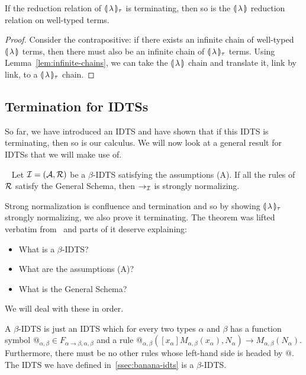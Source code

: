 \begin{corollary}
  If the reduction relation of $\llparenthesis \, \lambda \, \rrparenthesis_\tau$ is terminating, then
  so is the $\llparenthesis \, \lambda \, \rrparenthesis$ reduction relation on well-typed terms.
\end{corollary}

\begin{proof}
  Consider the contrapositive: if there exists an infinite chain of
  well-typed $\llparenthesis \, \lambda \, \rrparenthesis$ terms, then there must also be an infinite
  chain of $\llparenthesis \, \lambda \, \rrparenthesis_\tau$ terms. Using
  Lemma~\ref{lem:infinite-chains}, we can take the $\llparenthesis \, \lambda \, \rrparenthesis$ chain
  and translate it, link by link, to a $\llparenthesis \, \lambda \, \rrparenthesis_\tau$ chain.
\end{proof}


\subsection{Termination for IDTSs}

So far, we have introduced an IDTS and have shown that if this IDTS is
terminating, then so is our calculus. We will now look at a general result
for IDTSs that we will make use of.

\begin{theorem}
  \label{thm:idts-normalization}
  ~\cite{blanqui2000termination} Let
  $\mathcal{I} = (\mathcal{A}, \mathcal{R})$ be a $\beta$-IDTS satisfying the assumptions (A). If
  all the rules of $\mathcal{R}$ satisfy the General Schema, then $\to_{\mathcal{I}}$ is
  strongly normalizing.
\end{theorem}

Strong normalization is confluence and termination and so by showing
$\llparenthesis \, \lambda \, \rrparenthesis_\tau$ strongly normalizing, we also prove it
terminating. The theorem was lifted verbatim
from~\cite{blanqui2000termination} and parts of it deserve explaining:

\begin{itemize}
\item What is a $\beta$-IDTS?
\item What are the assumptions (A)?
\item What is the General Schema?
\end{itemize}

We will deal with these in order.

A $\beta$-IDTS is just an IDTS which for every two types $\alpha$ and
$\beta$ has a function symbol
$@_{\alpha,\beta} \in F_{\alpha \to \beta,\alpha,\beta}$ and a rule
$@_{\alpha,\beta}([x_\alpha] M_{\alpha, \beta}(x_\alpha), N_\alpha) \to
M_{\alpha,\beta}(N_\alpha)$. Furthermore, there must be no other rules
whose left-hand side is headed by $@$. The IDTS we have defined
in~\ref{ssec:banana-idts} is a $\beta$-IDTS.

